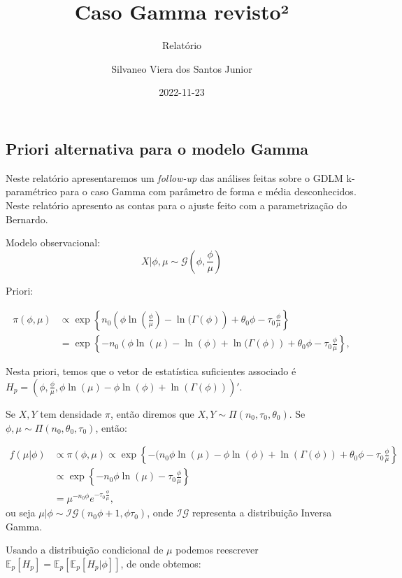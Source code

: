 \documentclass[
]{article}
\title{Caso Gamma revisto²}
\subtitle{Relatório}
\author{Silvaneo Viera dos Santos Junior}
\date{2022-11-23}
\begin{document}
\maketitle

\hypertarget{priori-alternativa-para-o-modelo-gamma}{%
\subsection{Priori alternativa para o modelo
Gamma}\label{priori-alternativa-para-o-modelo-gamma}}

Neste relatório apresentaremos um \emph{follow-up} das análises feitas
sobre o GDLM k-paramétrico para o caso Gamma com parâmetro de forma e
média desconhecidos. Neste relatório apresento as contas para o ajuste
feito com a parametrização do Bernardo.

Modelo observacional: \[
 X|\phi,\mu \sim \mathcal{G}\left(\phi,\frac{\phi}{\mu}\right)
 \]

Priori:

\[
\begin{aligned}
\pi(\phi,\mu) &\propto \exp\left\{n_0\left(\phi \ln\left(\frac{\phi}{\mu}\right)-\ln(\Gamma(\phi)\right)+\theta_0\phi-\tau_0\frac{\phi}{\mu}\right\}\\
&=\exp\left\{-n_0\left(\phi \ln(\mu)-\ln(\phi)+\ln(\Gamma(\phi)\right)+\theta_0\phi-\tau_0\frac{\phi}{\mu}\right\},
\end{aligned}
\]

Nesta priori, temos que o vetor de estatística suficientes associado é
\(H_{p}=\left(\phi,\frac{\phi}{\mu},\phi\ln(\mu)-\phi\ln(\phi)+\ln(\Gamma(\phi))\right)'\).

Se \(X,Y\) tem densidade \(\pi\), então diremos que
\(X,Y \sim \Pi(n_0,\tau_0,\theta_0)\). Se
\(\phi, \mu \sim \Pi\left(n_0,\theta_0,\tau_0\right)\), então:

\[
\begin{aligned}
f(\mu|\phi)&\propto \pi(\phi,\mu) \propto \exp\left\{-(n_0\phi \ln(\mu)-\phi\ln(\phi)+\ln(\Gamma(\phi))+\theta_0\phi-\tau_0\frac{\phi}{\mu}\right\}\\
& \propto \exp\left\{-n_0\phi \ln(\mu)-\tau_0\frac{\phi}{\mu}\right\}\\
&=\mu^{-n_0\phi}e^{-\tau_0\frac{\phi}{\mu}},
\end{aligned}
\] ou seja \(\mu|\phi \sim \mathcal{IG}(n_0 \phi+1,\phi\tau_0)\), onde
\(\mathcal{IG}\) representa a distribuição Inversa Gamma.

Usando a distribuição condicional de \(\mu\) podemos reescrever
\(\mathbb{E}_{p}[H_{p}]=\mathbb{E}_{p}[\mathbb{E}_{p}[H_{p}|\phi]]\), de
onde obtemos:
\end{document}
